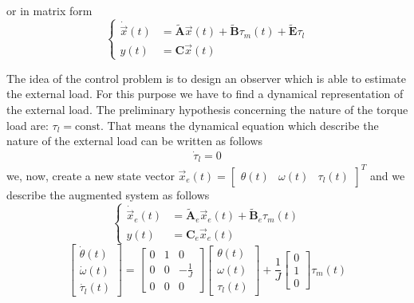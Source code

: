 \documentclass[11pt,a4paper,oneside]{book}
\numberwithin{equation}{section}
\theoremstyle{it}
\theoremstyle{definition}
\begin{document}
	or in matrix form
	\begin{equation} \label{example_1_eq2}
		\left\lbrace \begin{aligned}
			\dot{\vec{x}}(t) &=\tilde{\mathbf{A}}\vec{x}(t)+\tilde{\mathbf{B}}\tau_m(t)+\tilde{\mathbf{E}}\tau_l \\[6pt]
			y(t) &=\mathbf{C}\vec{x}(t)
		\end{aligned}\right. 
	\end{equation}
	
	The idea of the control problem is to design an observer which is able to estimate the external load. For this purpose we have to find a dynamical representation of the external load. The preliminary hypothesis concerning the nature of the torque load are: $\tau_l=\text{const}$. That means the dynamical equation which describe the nature of the external load can be written as follows
	\begin{equation} \label{example_1_eq3}
		\begin{aligned}
			\dot{\tau}_l=0
		\end{aligned}
	\end{equation}
	we, now, create a new state vector $\vec{x}_e(t)=\begin{bmatrix} \theta(t) & \omega(t) & \tau_l(t)\end{bmatrix}^T$ and we describe the augmented system as follows 
	\begin{equation} \label{example_1_eq4}
		\left\lbrace \begin{aligned}
			\dot{\vec{x}}_e(t) &=\tilde{\mathbf{A}}_e\vec{x}_e(t)+\tilde{\mathbf{B}}_e\tau_m(t) \\[6pt]
			y(t) &=\mathbf{C}_e\vec{x}_e(t)
		\end{aligned}\right. 
	\end{equation}
	\begin{equation} \label{example_1_eq5}
		\begin{bmatrix}
			\dot{\theta}(t) \\[6pt]
			\dot{\omega}(t) \\[6pt]
			\dot{\tau_l}(t) 
		\end{bmatrix}=
		\begin{bmatrix}
			0 & 1 & 0 \\[6pt]
			0 & 0 & -\frac{1}{J} \\[6pt]
			0 & 0 & 0
		\end{bmatrix}
		\begin{bmatrix}
			\theta(t) \\[6pt]
			\omega(t) \\[6pt]
			\tau_l(t) 
		\end{bmatrix}+\frac{1}{J}
		\begin{bmatrix}
			0 \\[6pt]
			1 \\[6pt]
			0 
		\end{bmatrix}\tau_m(t)
	\end{equation} 
\end{document}
